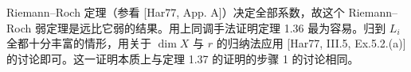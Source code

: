 Riemann--Roch 定理（参看 [Har77, App. A]）决定全部系数，故这个 Riemann--Roch 弱定理是远比它弱的结果。用上同调手法证明定理 1.36 最为容易。归到 $L_i$ 全都十分丰富的情形，用关于 $\dim X$ 与 $r$ 的归纳法应用 [Har77, III.5, Ex.5.2.(a)] 的讨论即可。这一证明本质上与定理 1.37 的证明的步骤 1 的讨论相同。


